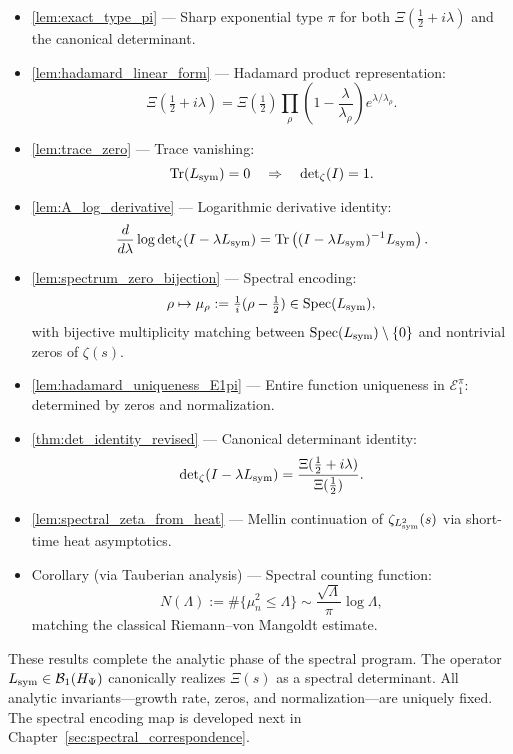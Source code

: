 \begin{itemize}
  \item \cref{lem:exact_type_pi} — Sharp exponential type \( \pi \) for both \( \Xi(\tfrac{1}{2} + i\lambda) \) and the canonical determinant.

  \item \cref{lem:hadamard_linear_form} — Hadamard product representation:
  \[
  \Xi\left( \tfrac{1}{2} + i\lambda \right) = \Xi\left( \tfrac{1}{2} \right) \prod_{\rho} \left(1 - \frac{\lambda}{\lambda_\rho}\right) e^{\lambda/\lambda_\rho}.
  \]

  \item \cref{lem:trace_zero} — Trace vanishing:
  \[
  \operatorname{Tr}(L_{\mathrm{sym}}) = 0 \quad \Rightarrow \quad \det\nolimits_\zeta(I) = 1.
  \]

  \item \cref{lem:A_log_derivative} — Logarithmic derivative identity:
  \[
  \frac{d}{d\lambda} \log \det\nolimits_\zeta(I - \lambda L_{\mathrm{sym}}) = \operatorname{Tr}\left( (I - \lambda L_{\mathrm{sym}})^{-1} L_{\mathrm{sym}} \right).
  \]

  \item \cref{lem:spectrum_zero_bijection} — Spectral encoding:
  \[
  \rho \mapsto \mu_\rho := \tfrac{1}{i}(\rho - \tfrac{1}{2}) \in \operatorname{Spec}(L_{\mathrm{sym}}),
  \]
  with bijective multiplicity matching between \( \operatorname{Spec}(L_{\mathrm{sym}}) \setminus \{0\} \) and nontrivial zeros of \( \zeta(s) \).

  \item \cref{lem:hadamard_uniqueness_E1pi} — Entire function uniqueness in \( \mathcal{E}_1^\pi \): determined by zeros and normalization.

  \item \cref{thm:det_identity_revised} — Canonical determinant identity:
  \[
  \det\nolimits_\zeta(I - \lambda L_{\mathrm{sym}}) = \frac{\Xi(\tfrac{1}{2} + i\lambda)}{\Xi(\tfrac{1}{2})}.
  \]

  \item \cref{lem:spectral_zeta_from_heat} — Mellin continuation of \( \zeta_{L_{\mathrm{sym}}^2}(s) \) via short-time heat asymptotics.

  \item Corollary (via Tauberian analysis) — Spectral counting function:
  \[
  N(\Lambda) := \#\{ \mu_n^2 \le \Lambda \} \sim \frac{\sqrt{\Lambda}}{\pi} \log \Lambda,
  \]
  matching the classical Riemann–von Mangoldt estimate.
\end{itemize}

\medskip

\noindent
These results complete the analytic phase of the spectral program. The operator \( L_{\mathrm{sym}} \in \mathcal{B}_1(H_{\Psi}) \) canonically realizes \( \Xi(s) \) as a spectral determinant. All analytic invariants—growth rate, zeros, and normalization—are uniquely fixed. The spectral encoding map is developed next in Chapter~\ref{sec:spectral_correspondence}.
